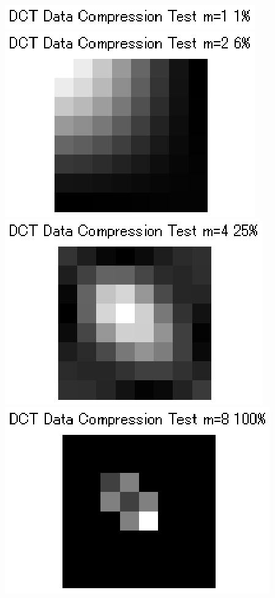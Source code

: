 \documentclass[12pt]{article}
\begin{document}
\begin{center}
\includegraphics{../images/II2IDCT1.eps}\\
\includegraphics{../images/II2IDCT2.eps}\\
\includegraphics{../images/II2IDCT4.eps}\\
\includegraphics{../images/II2IDCT8.eps}\\
\end{center}
\end{document}
